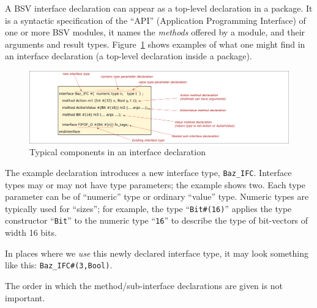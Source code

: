 \label{Sec_Whats_in_an_interface_declaration}


A BSV interface declaration can appear as a top-level declaration in a
package.  It is a syntactic specification of the ``API'' (Application
Programming Interface) of one or more BSV modules, {\ie} it names the
\emph{methods} offered by a module, and their arguments and result
types.  Figure~\ref{Fig_BSV_whats_in_an_interface_decl} shows examples
of what one might find in an interface declaration (a top-level
declaration inside a package).
\begin{figure}[htbp]
  \centerline{\includegraphics[width=6in,angle=0]{Figures/Fig_BSV_whats_in_an_interface_decl}}
  \caption{\label{Fig_BSV_whats_in_an_interface_decl}
           Typical components in an interface declaration}
\end{figure}

The example declaration introduces a new interface type,
\verb|Baz_IFC|.  Interface types may or may not have type parameters;
the example shows two.  Each type parameter can be of ``numeric'' type
or ordinary ``value'' type.  Numeric types are typically used for
``sizes''; for example, the type ``\verb|Bit#(16)|'' applies the type
constructor ``\verb|Bit|'' to the numeric type ``\verb|16|'' to
describe the type of bit-vectors of width 16 bits.

In places where we \emph{use} this newly declared interface type, it
may look something like this: \verb|Baz_IFC#(3,Bool)|.

The order in which the method/sub-interface declarations are given is
not important.

